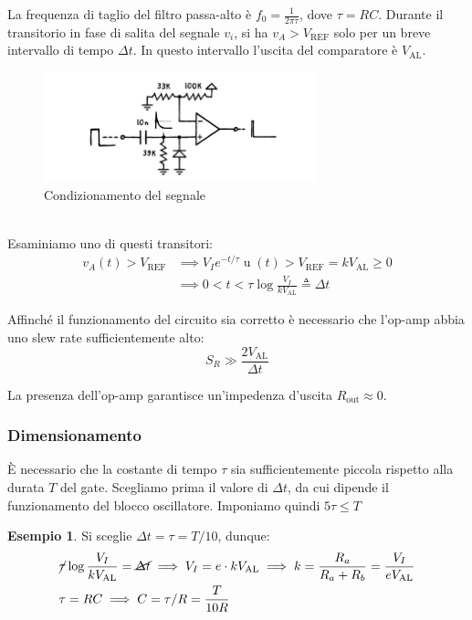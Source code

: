 \documentclass{article}
\newcommand{\var}[2]{#1_\mathrm{#2}}
\DeclareMathOperator{\ustep}{u}
\theoremstyle{definition}
\newtheorem{example}{Esempio}
\begin{document}
La frequenza di taglio del filtro passa-alto è \(f_0 = \frac{1}{2 \pi \tau}\), dove \(\tau = RC\).
Durante il transitorio in fase di salita del segnale \(v_i\), si ha \(v_A > \var{V}{REF}\) solo per un breve intervallo di tempo \(\Delta t\).
In questo intervallo l'uscita del comparatore è \(\var{V}{AL}\).
%
\begin{figure}[htp]
    \centering
    \includegraphics[width=0.7\textwidth]{gatebase.png} 
    \caption{Condizionamento del segnale}
    \label{fig:gate-to-trigger-condizionamento}
\end{figure}
\\
Esaminiamo uno di questi transitori:
\begin{align}
    v_A(t) > \var{V}{REF} & \implies
    V_I e^{-t/\tau} \ustep(t) > \var{V}{REF} = k \var{V}{AL} \geq 0 \nonumber \\
    & \implies 0 < t < \tau \log\frac{V_I}{k \var{V}{AL}} \triangleq \Delta t
    \label{eq:trigger-dt}
\end{align}

Affinché il funzionamento del circuito sia corretto è necessario che l'op-amp abbia uno slew rate sufficientemente alto:
\begin{equation*}
    S_R \gg \frac{2 \var{V}{AL}}{\Delta t}
\end{equation*}

La presenza dell'op-amp garantisce un'impedenza d'uscita \(\var{R}{out} \approx 0\).

\subsubsection{Dimensionamento}
È necessario che la costante di tempo \(\tau\) sia sufficientemente piccola rispetto alla durata \(T\) del gate.
Scegliamo prima il valore di \(\Delta t\), da cui dipende il funzionamento del blocco oscillatore.
Imponiamo quindi \(5 \tau \le T\)

\begin{example}
    Si sceglie \(\Delta t = \tau = T/10\), dunque:
    \begin{align*}
        &\cancel{\tau} \log\frac{V_I}{k \var{V}{AL}} = \cancel{\Delta t} \implies
        V_I = e \cdot k \var{V}{AL} \implies
        k = \frac{R_a}{R_a + R_b} = \frac{V_I}{e \var{V}{AL}} \\
        &\tau = RC \implies C = \tau/R = \frac{T}{10R}
    \end{align*}
\end{example}
\end{document}
